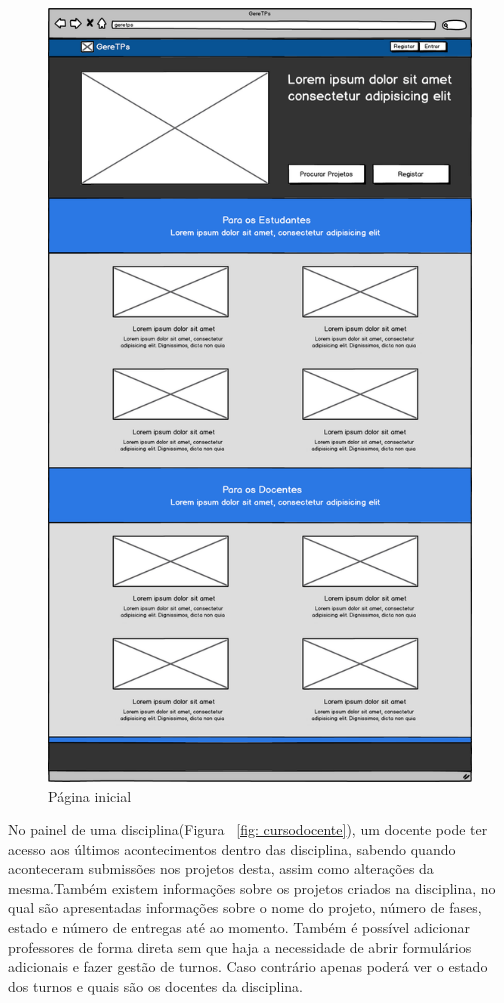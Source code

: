 \begin{figure}[htbp]
        \centering
        \includegraphics[width=1\textwidth]{images/prototipos/mockups/home.png}
         \caption{Página inicial}
         \label{fig: home}
\end{figure}

No painel de uma disciplina(Figura ~\ref{fig: cursodocente}), um docente pode ter acesso aos últimos acontecimentos dentro das disciplina, sabendo quando aconteceram submissões nos projetos desta, assim como alterações da mesma.Também existem informações sobre os projetos criados na disciplina, no qual são apresentadas informações sobre o nome do projeto, número de fases, estado e número de entregas até ao momento. Também é possível adicionar professores de forma direta sem que haja a necessidade de abrir formulários adicionais e fazer gestão de turnos. Caso contrário apenas poderá ver o estado dos turnos e quais são os docentes da disciplina.\\

